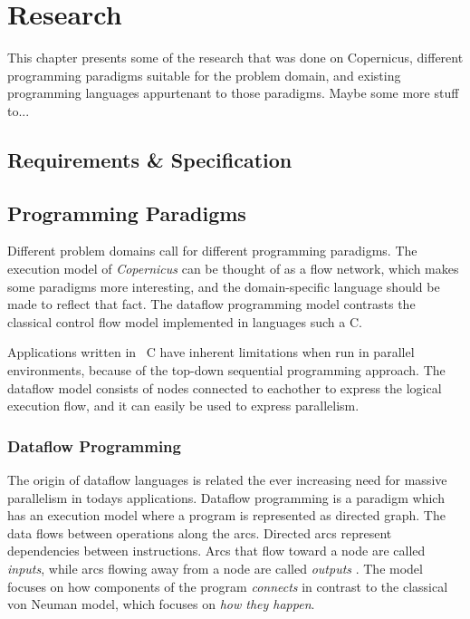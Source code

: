 \chapter{Research}\label{chap:research}
This chapter presents some of the research that was done on
Copernicus, different programming paradigms suitable for the problem
domain, and existing programming languages appurtenant to those
paradigms. Maybe some more stuff to...



\section{Requirements \& Specification}


\section{Programming Paradigms}
Different problem domains call for different programming
paradigms. The execution model of \emph{Copernicus} can be thought of
as a flow network, which makes some paradigms more interesting, and
the domain-specific language should be made to reflect that fact. The
dataflow programming model contrasts the classical control flow model
implemented in languages such a C.

Applications written in \eg~C have inherent limitations when run in
parallel environments, because of the top-down sequential programming
approach. The dataflow model consists of nodes connected to eachother
to express the logical execution flow, and it can easily be used to
express parallelism.


\subsection{Dataflow Programming}
The origin of dataflow languages is related the ever increasing need
for massive parallelism in todays applications. Dataflow programming
is a paradigm which has an execution model where a program is
represented as directed graph. The data flows between operations along
the arcs. Directed arcs represent dependencies between
instructions. Arcs that flow toward a node are called \emph{inputs},
while arcs flowing away from a node are called \emph{outputs}
\citep{johnston:2004}. The model focuses on how components of the
program \emph{connects} in contrast to the classical von Neuman model,
which focuses on \emph{how they happen}.


